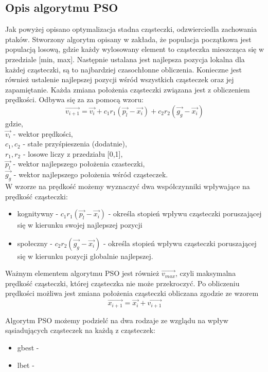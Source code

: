 \documentclass[twoside]{pracaMagisterskaMS}
\begin{document}
\subsection{Opis algorytmu PSO}
Jak powyżej opisano optymalizacja stadna cząsteczki, odzwierciedla zachowania ptaków. Stworzony algorytm opisany w  \cite{PSO} zakłada, że populacja początkowa jest populacją losową, gdzie każdy wylosowany element to cząsteczka mieszcząca się w przedziale [min, max]. Następnie ustalana jest najlepsza pozycja lokalna dla każdej cząsteczki, są to najbardziej czasochłonne obliczenia. Konieczne jest również ustalenie najlepszej pozycji wśród wszystkich cząsteczek oraz jej zapamiętanie. Każda zmiana położenia cząsteczki związana jest z obliczeniem prędkości. Odbywa się za za pomocą wzoru: 
\begin{equation} 
\vec{v_{i+1}} = \vec{v_{i}} + c_1 r_1 (\vec{p_{l}} - \vec{x_{i}}) + c_2 r_2 (\vec{g_{g}} - \vec{x_{i}})
\end{equation}   
	gdzie, \\
	$\vec{v_{i}}$ - wektor prędkości,\\
	$c_1, c_2$ - stałe przyśpieszenia (dodatnie),\\
	$r_1, r_2$ - losowe liczy z przedziału [0,1],\\
	$\vec{p_{l}}$ - wektor najlepszego położenia czasteczki,\\
	$\vec{g_{g}}$ - wektor najlepszego położenia wśród cząsteczek.\\
	
W wzorze na prędkość możemy wyznaczyć dwa współczynniki wpływające na prędkość cząsteczki:
\begin{itemize}
	\item kognitywny - $c_1 r_1 (\vec{p_{l}} - \vec{x_{i}})$ - określa stopień wpływu cząsteczki poruszającej się w kierunku swojej najlepszej pozycji 
	\item społeczny - $c_2 r_2 (\vec{g_{g}} - \vec{x_{i}})$ - określa stopień wpływu cząsteczki poruszającej się w kierunku pozycji globalnie najlepszej.
\end{itemize}
Ważnym elementem algorytmu PSO jest również $\vec{v_{max}}$, czyli maksymalna prędkość cząsteczki, której cząsteczka nie może przekroczyć. 
Po obliczeniu prędkości możliwa jest zmiana położenia cząsteczki obliczana zgodzie ze wzorem 
	 \begin{equation} 
	 \vec{x_{i+1}} = \vec{x_{i}} + \vec{v_{i+1}}
	 \end{equation}

Algorytm PSO możemy podzielć na dwa rodzaje ze wzglądu na wpływ sąsiadujących cząsteczek na każdą z cząsteczek:
\begin{itemize}
\item gbest - %
\item lbet - %
\end{itemize}	 
\end{document}
